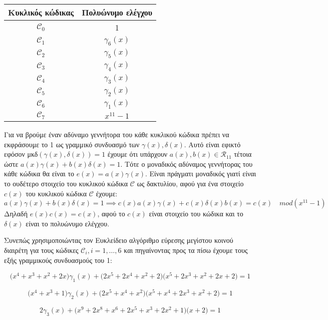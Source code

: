 \documentclass[oneside,a4paper]{article}
\newcommand{\C}{\mathcal{C}}
\newcommand{\R}{\mathcal{R}_{11}}
\begin{document}
\begin{enumerate}
\begin{center}
\begin{tabular}{ |c|c| } 
\hline
Κυκλικός κώδικας & Πολυώνυμο ελέγχου \\
\hline
$\C_0 $ & 1  \\ 
\hline
$\C_1$ & $\gamma_6 (x)$ \\ 
\hline
$\C_2$ & $\gamma_5 (x)$ \\                                
\hline
$\C_3$ & $\gamma_4 (x)$ \\
\hline
$\C_4$ & $\gamma_3 (x)$ \\
\hline
$\C_5$ & $\gamma_2 (x)$ \\
\hline
$\C_6$ & $\gamma_1 (x)$ \\
\hline
$\C_7$ & $x^{11} - 1$ \\                                
\hline
\end{tabular}
\end{center}


Για να βρούμε έναν αδύναμο γεννήτορα του κάθε κυκλικού κώδικα πρέπει να εκφράσουμε το 1 ως γραμμικό συνδυασμό των $\gamma (x) , \delta (x)$. Αυτό είναι εφικτό εφόσον μκδ$(\gamma (x) , \delta (x) ) = 1$ έχουμε ότι υπάρχουν $a(x) , b(x) \in \R$ τέτοια ώστε $ a(x) \gamma (x) + b(x) \delta (x) = 1$. Τότε ο μοναδικός αδύναμος γεννήτορας του κάθε κώδικα θα είναι το $e(x) = a(x) \gamma (x)$. Είναι πράγματι μοναδικός γιατί είναι το ουδέτερο στοιχείο του κυκλικού κώδικα $\C$ ως δακτυλίου, αφού για ένα στοιχείο $c(x)$ του κυκλικού κώδικα $\C$ έχουμε:
	\[ a(x) \gamma (x) + b(x) \delta (x) = 1 \implies c(x) a(x) \gamma(x) + c(x) \delta (x) b(x) = c(x) \quad mod(x^{11} -1 )  \]
	Δηλαδή $ e(x) c(x) = c(x)$, αφού το $c(x)$ είναι στοιχείο του κώδικα και το $\delta (x)$ είναι το πολυώνυμο ελέγχου.
	$ $\newline

	Συνεπώς χρησιμοποιώντας τον Ευκλείδειο αλγόριθμο εύρεσης μεγίστου κοινού διαιρέτη για τους κώδικες $\C_i, i=1,\ldots, 6$ και πηγαίνοντας προς τα πίσω έχουμε τους εξής γραμμικούς συνδυασμούς του 1:
	$ $\newline

	$$\bigg(x^{4} + x^{3} + x^{2} + 2 x\bigg) \gamma_1 (x) + \bigg(2 x^{5} + 2 x^{4} + x^{2} + 2\bigg)\bigg(x^{5} + 2 x^{3} + x^{2} + 2 x + 2\bigg) = 1$$ 

	$$\bigg(x^{4} + x^{3} + 1\bigg) \gamma_2 (x) + \bigg(2 x^{5} + x^{4} + x^{2}\bigg)\bigg(x^{5} + x^{4} + 2 x^{3} + x^{2} + 2\bigg) = 1$$ 

	$$ 2 \gamma_3 (x) + \bigg(x^{9} + 2 x^{8} + x^{6} + 2 x^{5} + x^{3} + 2 x^{2} + 1\bigg)\bigg(x + 2\bigg) = 1$$ 


\end{enumerate}
\end{document}
